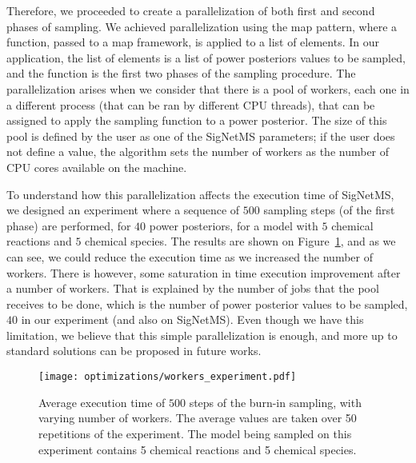 
Therefore, we proceeded to create a parallelization of both first and
second phases of sampling. We achieved parallelization using the map
pattern, where a function, passed to a map framework, is applied to a
list of elements. In our application, the list of elements is a list of
power posteriors values to be sampled, and the function is the first two
phases of the sampling procedure. The parallelization arises when we 
consider that there is a pool of workers, each one in a different 
process (that can be ran by different CPU threads), that can be assigned
to apply the sampling function to a power posterior. The size of this 
pool is defined by the user as one of the SigNetMS parameters; if the 
user does not define a value, the algorithm sets the number of workers 
as the number of CPU cores available on the machine.

To understand how this parallelization affects the execution time of
SigNetMS, we designed an experiment where a sequence of $500$ sampling
steps (of the first phase) are performed, for $40$ power posteriors, for
a model with $5$ chemical reactions and $5$ chemical species. The
results are shown on Figure~\ref{fig:parallel_map_sampling},
and as we can see, we could reduce the execution time as we increased
the number of workers. There is however, some saturation in time
execution improvement after a number of workers. That is explained by 
the number of jobs that the pool receives to be done, which is the 
number of power posterior values to be sampled, $40$ in our experiment 
(and also on SigNetMS). Even though we have this limitation, we believe 
that this simple parallelization is enough, and more up to standard 
solutions can be proposed in future works. 

\begin{figure}[t!]
    \begin{center}
    \texttt{[image: optimizations/workers\_experiment.pdf]}
    \caption{Average execution time of $500$ steps of the burn-in
        sampling, with varying number of workers. The average values are
        taken over 50 repetitions of the experiment. The model being
        sampled on this experiment contains 5 chemical reactions and 5
        chemical species.}
    \label{fig:parallel_map_sampling}
    \end{center}
\end{figure}

%
% 

